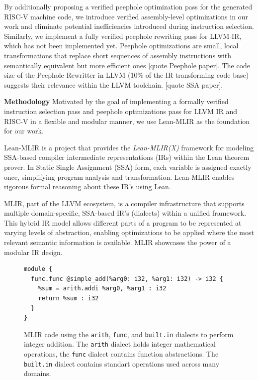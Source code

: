 By additionally proposing a verified peephole optimization pass for the generated RISC-V machine code,  we introduce verified assembly-level optimizations in our work and eliminate potential inefficiencies introduced during instruction selection. Similarly, we implement a fully verified peephole rewriting pass for LLVM-IR, which has not been implemented yet. Peephole optimizations are small, local transformations that replace short sequences of assembly instructions with semantically equivalent but more efficient ones [quote Peephole paper]. The code size of the Peephole Rewritter in LLVM (10\% of the IR transforming code base) suggests their relevance within the LLVM toolchain. [quote SSA paper].

\textbf{Methodology}
Motivated by the goal of implementing a formally verified instruction selection pass and peephole optimizations pass for LLVM IR and RISC-V in a flexible and modular manner, we use Lean-MLIR as the foundation for our work.

Lean-MLIR is a project that provides the  \textit{Lean-MLIR(X)}  framework for modeling SSA-based compiler intermediate representations (IRs) within the Lean theorem prover. In Static Single Assignment (SSA) form, each variable is assigned exactly once, simplifying program analysis and transformation. Lean-MLIR enables rigorous formal reasoning about these IR's using Lean.

MLIR, part of the LLVM ecosystem, is a compiler infrastructure that supports multiple domain-specific, SSA-based IR's (dialects) within a unified framework. This hybrid IR model allows different parts of a program to be represented at varying levels of abstraction, enabling optimizations to be applied where the most relevant semantic information is available. MLIR showcases the power of a modular IR design.

\begin{figure}[ht]
\centering
\begin{lstlisting}[language=mlir, basicstyle=\ttfamily\small]
module {
  func.func @simple_add(%arg0: i32, %arg1: i32) -> i32 {
    %sum = arith.addi %arg0, %arg1 : i32
    return %sum : i32
  }
}

\end{lstlisting}
\caption{ MLIR code using the \texttt{arith}, \texttt{func},  and \texttt{built.in} dialects to perform integer addition. The \texttt{arith} dialect holds integer mathematical operations, the \texttt{func} dialect contains function abstractions. The \texttt{built.in} dialect contains standart operations used across many domains.}
\label{fig:mlir-addition}
\end{figure}

